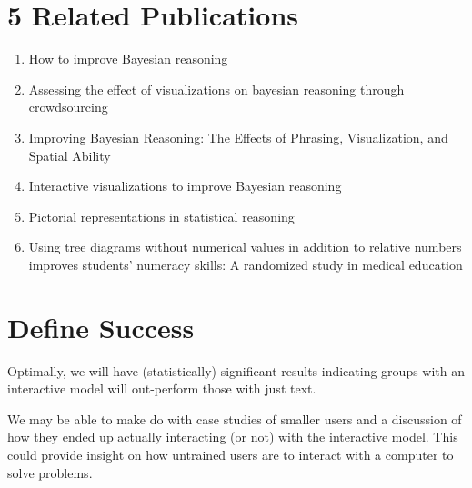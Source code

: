 \documentclass{proc}
\begin{document}
\section{5 Related Publications}
\begin{enumerate}
    \item How to improve Bayesian reasoning \cite{Gigerenzer1995} \item
    Assessing the effect of visualizations on bayesian reasoning through
    crowdsourcing \cite{Micallef2012} 

    \item Improving Bayesian Reasoning: The
    Effects of Phrasing, Visualization, and Spatial Ability \cite{Ottley2016}
    \item Interactive visualizations to improve Bayesian reasoning
    \cite{Tsai2011} 

    \item Pictorial representations in statistical reasoning
    \cite{Brase2009} 

    \item Using tree diagrams without numerical values in
    addition to relative numbers improves students' numeracy skills: A
    randomized study in medical education \cite{Friederichs2014}

\end{enumerate}

\section{Define Success}

Optimally, we will have (statistically) significant results indicating groups with an interactive
model will out-perform those with just text. 

We may be able to make do with case studies of smaller users and a discussion of how they ended up 
actually interacting (or not) with the interactive model. This could provide insight on how untrained
users are to interact with a computer to solve problems. 



\end{document}
